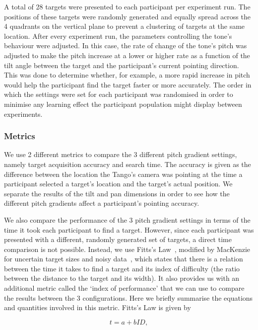 \documentclass[sigconf, review=true, screen=true, anonymous=true]{acmart}
\begin{document}
A total of 28 targets were presented to each participant per experiment run.
The positions of these targets were randomly generated and equally spread across the 4 quadrants on the vertical plane to prevent a clustering of targets at the same location.
After every experiment run, the parameters controlling the tone's behaviour were adjusted.
In this case, the rate of change of the tone's pitch was adjusted to make the pitch increase at a lower or higher rate as a function of the tilt angle between the target and the participant's current pointing direction.
This was done to determine whether, for example, a more rapid increase in pitch would help the participant find the target faster or more accurately. 
The order in which the settings were set for each participant was randomised in order to minimise any learning effect the participant population might display between experiments. 

\subsubsection{Metrics}

We use 2 different metrics to compare the 3 different pitch gradient settings, namely target acquisition accuracy and search time.
The accuracy is given as the difference between the location the Tango's camera was pointing at the time a participant selected a target's location and the target's actual position.
We separate the results of the tilt and pan dimensions in order to see how the different pitch gradients affect a participant's pointing accuracy. 

We also compare the performance of the 3 pitch gradient settings in terms of the time it took each participant to find a target.
However, since each participant was presented with a different, randomly generated set of targets, a direct time comparison is not possible.
Instead, we use Fitts's Law~\cite{fitts1954information}, modified by MacKenzie for uncertain target sizes and noisy data~\cite{mackenzie1992fitts}, which states that there is a relation between the time it takes to find a target and its index of difficulty (the ratio between the distance to the target and its width).
It also provides us with an additional metric called the `index of performance' that we can use to compare the results between the 3 configurations. 
Here we briefly summarise the equations and quantities involved in this metric. 
Fitts's Law is given by  

\begin{equation}
  \label{eq:fitts-base}
  t = a + bID,
\end{equation}
\end{document}
